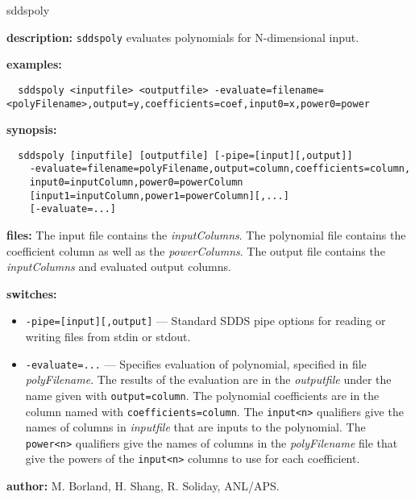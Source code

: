 \begin{sddsprog}{sddspoly}
  \item \textbf{description:} \verb|sddspoly| evaluates polynomials for N-dimensional input.
  \item \textbf{examples:}
    \begin{verbatim}
  sddspoly <inputfile> <outputfile> -evaluate=filename=<polyFilename>,output=y,coefficients=coef,input0=x,power0=power
    \end{verbatim}
  \item \textbf{synopsis:}
    \begin{verbatim}
  sddspoly [inputfile] [outputfile] [-pipe=[input][,output]]
    -evaluate=filename=polyFilename,output=column,coefficients=column,
    input0=inputColumn,power0=powerColumn
    [input1=inputColumn,power1=powerColumn][,...]
    [-evaluate=...]
    \end{verbatim}
  \item \textbf{files:} The input file contains the \emph{inputColumns}. The polynomial file contains the coefficient column as well as the \emph{powerColumns}. The output file contains the \emph{inputColumns} and evaluated output columns.
  \item \textbf{switches:}
    \begin{itemize}
      \item \verb|-pipe=[input][,output]| --- Standard SDDS pipe options for reading or writing files from stdin or stdout.
      \item \verb|-evaluate=...| --- Specifies evaluation of polynomial, specified in file \emph{polyFilename}. The results of the evaluation are in the \emph{outputfile} under the name given with \verb|output=column|. The polynomial coefficients are in the column named with \verb|coefficients=column|. The \verb|input<n>| qualifiers give the names of columns in \emph{inputfile} that are inputs to the polynomial. The \verb|power<n>| qualifiers give the names of columns in the \emph{polyFilename} file that give the powers of the \verb|input<n>| columns to use for each coefficient.
    \end{itemize}
  \item \textbf{author:} M. Borland, H. Shang, R. Soliday, ANL/APS.
\end{sddsprog}

